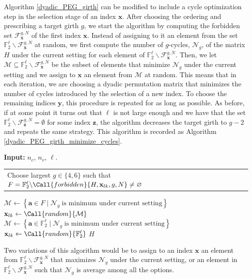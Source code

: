\documentclass[11pt]{article}
\makeatletter
\newcommand{\Input}{\State \textbf{Input: }}
\theoremstyle{plain}
\theoremstyle{plain}
\newcommand{\multiline}[1]{%
  \begin{tabularx}{\dimexpr\linewidth-\ALG@thistlm}[t]{@{}X@{}}
    #1
  \end{tabularx}
}
\theoremstyle{definition}
\numberwithin{theo}{section}
\newcommand{\ba}{{\mathbf a}}
\newcommand{\bx}{{\mathbf x}}
\newcommand{\by}{{\mathbf y}}
\newcommand{\bz}{{\mathbf z}}
\newcounter{rom}
\makeatother
\begin{document}
Algorithm \ref{dyadic_PEG_girth} can be modified to include a cycle optimization step in the selection stage of an index $\bx$. After choosing the ordering and prescribing a target girth $g$, we start the algorithm by computing the forbidden set $\mathcal{F}_{\bx}^{g,N}$ of the first index $\bx$. Instead of assigning to it an element from the set $\mathbb{F}_2^\ell\backslash\mathcal{F}_{\bx}^{g,N}$ at random, we first compute the number of $g$-cycles, $\mathcal{N}_g$, of the matrix $H$ under the current setting for each element of $\mathbb{F}_2^\ell\backslash\mathcal{F}_{\bx}^{g,N}$. Then, we let $\mathcal{M}\subseteq\mathbb{F}_2^\ell\backslash\mathcal{F}_{\bx}^{g,N}$ be the subset of elements that minimize $\mathcal{N}_g$ under the current setting and we assign to $\bx$ an element from $\mathcal{M}$ at random. This means that in each iteration, we are choosing a dyadic permutation matrix that minimizes the number of cycles introduced by the selection of a new index. To choose the remaining indices $\by$, this procedure is repeated for as long as possible. As before, if at some point it turns out that $\ell$ is not large enough and we have that the set $\mathbb{F}_2^\ell\backslash\mathcal{F}_{\bz}^{g,N}=\emptyset$ for some index $\bz$, the algorithm decreases the target girth to $g-2$ and repeats the same strategy. This algorithm is recorded as Algorithm \ref{dyadic_PEG_girth_minimize_cycles}. 
\begin{algorithm}[t]
\caption{Quasi-dyadic PEG algorithm with forbidden sets and cycle minimization}
\label{dyadic_PEG_girth_minimize_cycles}
\begin{algorithmic}[0]
\Input{$n_c$, $n_v$, $\ell$.}
\State{Initialize indices $\bx_{lk}=\infty$, $l\in[n_c]$, $k\in[n_v]$.}
		\State \multiline{Choose largest $g\in\{4,6\}$ such that $F=\mathbb{F}_2^\ell\backslash\Call{forbidden}{H,\bx_{lk},g,N}\neq\varnothing$}
            \State $\mathcal{M}\gets\left\{\ba\in F\mid\mathcal{N}_g\;\text{is minimum under current setting}\right\}$
			\State $\bx_{lk} \gets \Call{random}{\mathcal{M}}$	
		\Else
            \State $\mathcal{M}\gets\left\{\ba\in \mathbb{F}_2^\ell\mid\mathcal{N}_g\;\text{is minimum under current setting}\right\}$
			\State $\bx_{lk} \gets \Call{random}{\mathbb{F}_2^\ell}$	
		\EndIf
	\EndFor
\EndFor
\State \Return $H$
\end{algorithmic}
\end{algorithm}
Two variations of this algorithm would be to assign to an index $\bx$ an element from $\mathbb{F}_2^\ell\backslash\mathcal{F}_{\bx}^{g,N}$ that maximizes $\mathcal{N}_g$ under the current setting, or an element in $\mathbb{F}_2^\ell\backslash\mathcal{F}_{\bx}^{g,N}$ such that $\mathcal{N}_g$ is average among all the options.
\end{document}
